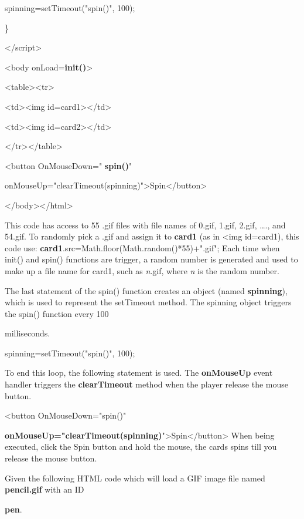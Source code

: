 \documentclass[
]{article}
\begin{document}
spinning=setTimeout("spin()", 100);

\}

\textless/script\textgreater{}

\textless body onLoad=\textbf{init()}\textgreater{}

\textless table\textgreater\textless tr\textgreater{}

\textless td\textgreater\textless img
id=card1\textgreater\textless/td\textgreater{}

\textless td\textgreater\textless img
id=card2\textgreater\textless/td\textgreater{}

\textless/tr\textgreater\textless/table\textgreater{}

\textless button OnMouseDown=" \textbf{spin()}"

onMouseUp="clearTimeout(spinning)"\textgreater Spin\textless/button\textgreater{}

\textless/body\textgreater\textless/html\textgreater{}

This code has access to 55 .gif files with file names of 0.gif, 1.gif,
2.gif, \ldots., and 54.gif. To randomly pick a .gif and assign it to
\textbf{card1} (as in \textless img id=card1), this code use:
\textbf{card1}.src=Math.floor(Math.random()*55)+".gif"; Each time when
init() and spin() functions are trigger, a random number is generated
and used to make up a file name for card1, such as \emph{n}.gif, where
\emph{n} is the random number.

The last statement of the spin() function creates an object (named
\textbf{spinning}), which is used to represent the setTimeout method.
The spinning object triggers the spin() function every 100

milliseconds.

spinning=setTimeout("spin()", 100);

To end this loop, the following statement is used. The
\textbf{onMouseUp} event handler triggers the \textbf{clearTimeout}
method when the player release the mouse button.

\textless button OnMouseDown="spin()"

\textbf{onMouseUp="clearTimeout(spinning)}"\textgreater Spin\textless/button\textgreater{}
When being executed, click the Spin button and hold the mouse, the cards
spins till you release the mouse button.

Given the following HTML code which will load a GIF image file named
\textbf{pencil.gif} with an ID

\textbf{pen}.
\end{document}
